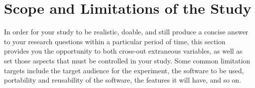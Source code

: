 \section{Scope and Limitations of the Study}

In order for your study to be realistic, doable, and still produce a concise answer to your research questions within a particular period of time, this section provides you the opportunity to both cross-out extraneous variables, as well as set those aspects that must be controlled in your study. Some common limitation targets include the target audience for the experiment, the software to be used, portability and reusability of the software, the features it will have, and so on.